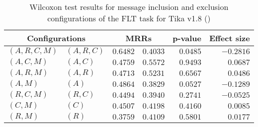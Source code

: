 
\begin{table}
\begin{spacing}{1.2}
\centering
\caption{Wilcoxon test results for message inclusion and exclusion configurations of the FLT task for Tika v1.8 (\ctwo)}
\label{table:versus-wilcox-tika-flt-message}
\begin{tabular}{ll|rr|rr}
\toprule
      \multicolumn{2}{c|}{Configurations} &                \multicolumn{2}{c|}{MRRs} &             p-value & Effect size \\
\midrule
 $(A,R,C,M)$ &  $(A,R,C)$ &  $\bm{0.6482}$ &       $0.4033$ & $0.0485$ &   $-0.2816$ \\
   $(A,C,M)$ &    $(A,C)$ &       $0.4759$ &  $\bm{0.5572}$ & $0.9493$ &    $0.0687$ \\
   $(A,R,M)$ &    $(A,R)$ &       $0.4713$ &  $\bm{0.5231}$ & $0.6567$ &    $0.0486$ \\
     $(A,M)$ &      $(A)$ &  $\bm{0.4864}$ &       $0.3829$ & $0.0527$ &   $-0.1289$ \\
   $(R,C,M)$ &    $(R,C)$ &  $\bm{0.4494}$ &       $0.3940$ & $0.2741$ &   $-0.0525$ \\
     $(C,M)$ &      $(C)$ &  $\bm{0.4507}$ &       $0.4198$ & $0.4160$ &    $0.0085$ \\
     $(R,M)$ &      $(R)$ &       $0.3759$ &  $\bm{0.4109}$ & $0.5801$ &    $0.0177$ \\
\bottomrule
\end{tabular}

\end{spacing}
\end{table}

